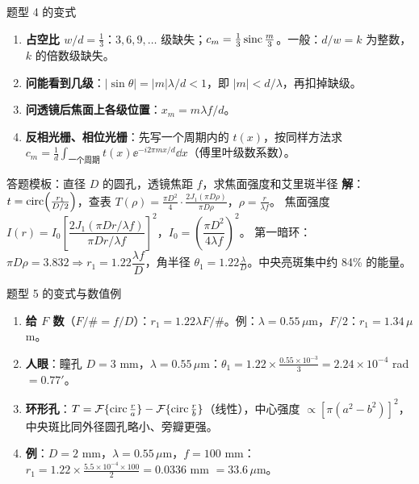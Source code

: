 \begin{recipe}{题型 4 的变式}
\begin{enumerate}
\item \textbf{占空比 $w/d=\frac13$}：$3,6,9,\dots$ 级缺失；$c_m=\frac13\operatorname{sinc}\frac m3$。一般：$d/w=k$ 为整数，$k$ 的倍数级缺失。
\item \textbf{问能看到几级}：$|\sin\theta|=|m|\lambda/d<1$，即 $|m|<d/\lambda$，再扣掉缺级。
\item \textbf{问透镜后焦面上各级位置}：$x_m=m\lambda f/d$。
\item \textbf{反相光栅、相位光栅}：先写一个周期内的 $t(x)$，按同样方法求 $c_m=\frac1d\int_{\text{一个周期}}t(x)\ee^{-i2\pi mx/d}\dd x$（傅里叶级数系数）。
\end{enumerate}
\end{recipe}


\begin{exam}{答题模板：直径 $D$ 的圆孔，透镜焦距 $f$，求焦面强度和艾里斑半径}
\textbf{解}：$t=\operatorname{circ}\!\left(\frac{r_1}{D/2}\right)$，查表
$T(\rho)=\frac{\pi D^2}{4}\cdot\frac{2J_1(\pi D\rho)}{\pi D\rho}$，$\rho=\frac{r}{\lambda f}$。
焦面强度 $I(r)=I_0\left[\dfrac{2J_1(\pi Dr/\lambda f)}{\pi Dr/\lambda f}\right]^2$，$I_0=\left(\dfrac{\pi D^2}{4\lambda f}\right)^2$。
第一暗环：$\pi D\rho=3.832\Rightarrow\boxed{r_1=1.22\dfrac{\lambda f}{D}}$，角半径 $\theta_1=1.22\frac\lambda D$。中央亮斑集中约 84\% 的能量。
\end{exam}

\begin{recipe}{题型 5 的变式与数值例}
\begin{enumerate}
\item \textbf{给 $F$ 数}（$F/\#=f/D$）：$r_1=1.22\lambda F/\#$。例：$\lambda=0.55\,\mu$m，$F/2$：$r_1=1.34\,\mu$m。
\item \textbf{人眼}：瞳孔 $D=3$ mm，$\lambda=0.55\,\mu$m：$\theta_1=1.22\times\frac{0.55\times10^{-3}}{3}=2.24\times10^{-4}$ rad $=0.77'$。
\item \textbf{环形孔}：$T=\mathcal{F}\{\operatorname{circ}\frac ra\}-\mathcal{F}\{\operatorname{circ}\frac rb\}$（线性），中心强度 $\propto[\pi(a^2-b^2)]^2$，中央斑比同外径圆孔略小、旁瓣更强。
\item \textbf{例}：$D=2$ mm，$\lambda=0.55\,\mu$m，$f=100$ mm：$r_1=1.22\times\frac{5.5\times10^{-4}\times100}{2}=0.0336$ mm $=33.6\,\mu$m。
\end{enumerate}
\end{recipe}


